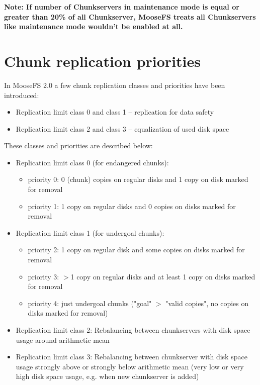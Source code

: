 \documentclass[a4paper,11pt,english]{report}
\begin{document}
		\bigskip

		\textbf{Note: If number of Chunkservers in maintenance mode is equal or greater than 20\% of all Chunkserver, MooseFS treats all Chunkservers like maintenance mode wouldn't be enabled at all.}
		
		\section{Chunk replication priorities}
		In MooseFS 2.0 a few chunk replication classes and priorities have been introduced:
		\begin{itemize}
			\item Replication limit class 0 and class 1 -- replication for data safety
			\item Replication limit class 2 and class 3 -- equalization of used disk space
		\end{itemize}
		
		\bigskip
		\bigskip
		These classes and priorities are described below:		
		\bigskip		
		
		\begin{itemize}
			\item Replication limit class 0 (for endangered chunks):
				\begin{itemize}
					\item priority 0: 0 (chunk) copies on regular disks and 1 copy on disk marked for removal
					\item priority 1: 1 copy on regular disks and 0 copies on disks marked for removal
				\end{itemize}
				
			\item Replication limit class 1 (for undergoal chunks):
				\begin{itemize}
					\item priority 2: 1 copy on regular disk and some copies on disks marked for removal
					\item priority 3: $>$1 copy on regular disks and at least 1 copy on disks marked for removal
					\item priority 4: just undergoal chunks ("goal" $>$ "valid copies", no copies on disks marked for removal)
				\end{itemize}
				
			\item Replication limit class 2: Rebalancing between chunkservers with disk space usage around arithmetic mean
			\item Replication limit class 3: Rebalancing between chunkserver with disk space usage strongly above or strongly below arithmetic mean (very low or very high disk space usage, e.g. when new chunkserver is added)
		\end{itemize}
\end{document}
